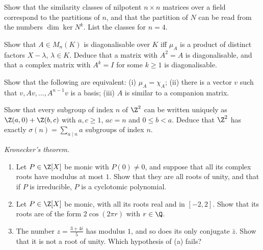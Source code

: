 \begin{exercise}[$\star\star$]\label{ex:nilpotent}
Show that the similarity classes of nilpotent $n\times n$ matrices over a field correspond to the partitions of $n$, and that the partition of $N$ can be read from the numbers $\dim\ker N^k$. List the classes for $n=4$.
\end{exercise}

\begin{exercise}[$\star\star$]\label{ex:diagonalisable}
Show that $A\in M_n(K)$ is diagonalisable over $K$ iff $\mu_A$ is a product of distinct factors $X-\lambda$, $\lambda\in K$. Deduce that a matrix with $A^2=A$ is diagonalisable, and that a complex matrix with $A^k=I$ for some $k\ge1$ is diagonalisable.
\end{exercise}

\begin{exercise}[$\star\star$]\label{ex:cyclicvector}
Show that the following are equivalent: (i) $\mu_A=\chi_A$; (ii) there is a vector $v$ such that $v,Av,\dots,A^{n-1}v$ is a basis; (iii) $A$ is similar to a companion matrix.
\end{exercise}

\begin{exercise}[$\star\star\star$]\label{ex:sublattices}
Show that every subgroup of index $n$ of $\Z^2$ can be written uniquely as $\Z(a,0)+\Z(b,c)$ with $a,c\ge1$, $ac=n$ and $0\le b<a$. Deduce that $\Z^2$ has exactly $\sigma(n)=\sum_{a\mid n}a$ subgroups of index $n$.
\end{exercise}

\begin{exercise}[$\star\star\star$]\label{pb:kronecker}
\emph{Kronecker's theorem.}
\begin{enumerate}[label=(\alph*)]
\item Let $P\in\Z[X]$ be monic with $P(0)\ne0$, and suppose that all its complex roots have modulus at most $1$. Show
that they are all roots of unity, and that if $P$ is irreducible, $P$ is a cyclotomic polynomial.
\item Let $P\in\Z[X]$ be monic, with all its roots real and in $[-2,2]$. Show that its roots are of the form $2\cos(2\pi r)$
with $r\in\Q$.
\item The number $z=\frac{3+4i}5$ has modulus $1$, and so does its only conjugate $\bar z$. Show that it is not a root of
unity. Which hypothesis of (a) fails?
\end{enumerate}
\end{exercise}

